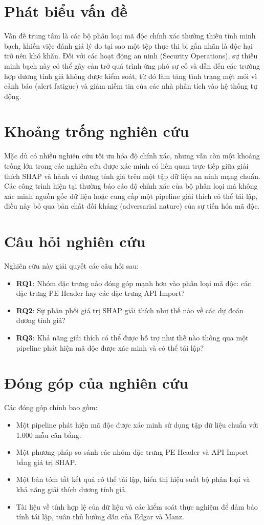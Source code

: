 \documentclass[conference]{IEEEtran}
\begin{document}
\section{Phát biểu vấn đề}
Vấn đề trung tâm là các bộ phân loại mã độc chính xác thường thiếu tính minh bạch, khiến việc đánh giá lý do tại sao một tệp thực thi bị gắn nhãn là độc hại trở nên khó khăn. Đối với các hoạt động an ninh (Security Operations), sự thiếu minh bạch này có thể gây cản trở quá trình ứng phó sự cố và dẫn đến các trường hợp dương tính giả không được kiểm soát, từ đó làm tăng tình trạng mệt mỏi vì cảnh báo (alert fatigue) và giảm niềm tin của các nhà phân tích vào hệ thống tự động.

\section{Khoảng trống nghiên cứu}
Mặc dù có nhiều nghiên cứu tối ưu hóa độ chính xác, nhưng vẫn còn một khoảng trống lớn trong các nghiên cứu được xác minh có liên quan trực tiếp giữa giải thích SHAP và hành vi dương tính giả trên một tập dữ liệu an ninh mạng chuẩn. Các công trình hiện tại thường báo cáo độ chính xác của bộ phân loại mà không xác minh nguồn gốc dữ liệu hoặc cung cấp một pipeline giải thích có thể tái lập, điều này bỏ qua bản chất đối kháng (adversarial nature) của sự tiến hóa mã độc.

\section{Câu hỏi nghiên cứu}
Nghiên cứu này giải quyết các câu hỏi sau:
\begin{itemize}
    \item \textbf{RQ1}: Nhóm đặc trưng nào đóng góp mạnh hơn vào phân loại mã độc: các đặc trưng PE Header hay các đặc trưng API Import?
    \item \textbf{RQ2}: Sự phân phối giá trị SHAP giải thích như thế nào về các dự đoán dương tính giả?
    \item \textbf{RQ3}: Khả năng giải thích có thể được hỗ trợ như thế nào thông qua một pipeline phát hiện mã độc được xác minh và có thể tái lập?
\end{itemize}

\section{Đóng góp của nghiên cứu}
Các đóng góp chính bao gồm:
\begin{itemize}
    \item Một pipeline phát hiện mã độc được xác minh sử dụng tập dữ liệu chuẩn với 1.000 mẫu cân bằng.
    \item Một phương pháp so sánh các nhóm đặc trưng PE Header và API Import bằng giá trị SHAP.
    \item Một bản tóm tắt kết quả có thể tái lập, hiển thị hiệu suất bộ phân loại và khả năng giải thích dương tính giả.
    \item Tài liệu về tính hợp lệ của dữ liệu và các kiểm soát thực nghiệm để đảm bảo tính tái lập, tuân thủ hướng dẫn của Edgar và Manz.
\end{itemize}
\end{document}
